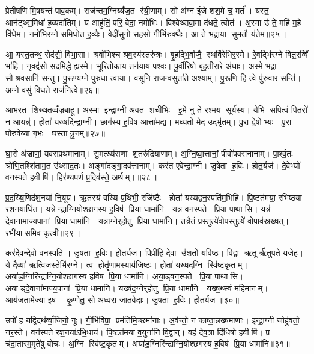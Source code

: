प्रेती॑षणि मि॒षय॑न्तं पाव॒कम्। राज॑न्तम॒ग्निय्यँ॑ज॒त र॑यी॒णाम्। सो अ॑ग्न ईजे शश॒मे च॒ मर्त॑। यस्त॒ आन॑ट्थ्स॒मिधा॑ ह॒व्यदा॑तिम्। य आहु॑तिं॒ परि॒ वेदा॒ नमो॑भिः। विश्वेथ्सवा॒मा द॑धते॒ त्वोत॑। अ॒स्मा उ॑ ते॒ महि॑ म॒हे वि॑धेम। नमो॑भिरग्ने स॒मिधो॒त ह॒व्यैः। वेदी॑सूनो सहसो गी॒र्भिरु॒क्थैः। आ ते भ॒द्राया सुम॒तौ य॑तेम॥२५॥

आ॒ यस्त॒तन्थ॒ रोद॑सी॒ विभा॒सा। श्रवो॑भिश्च श्रव॒स्य॑स्तरु॑त्रः। बृ॒हद्भि॒र्वाजै॒ स्थवि॑रेभिर॒स्मे। रे॒वद्भि॑रग्ने वित॒रव्विँ भा॑हि। नृ॒वद्व॑सो॒ सद॒मिद्धेह्य॒स्मे। भूरि॑तो॒काय॒ तन॑याय प॒श्वः। पू॒र्वीरिषो॑ बृह॒तीरा॒रे अ॑घाः। अ॒स्मे भ॒द्रा सौश्रव॒सानि॑ सन्तु। पु॒रूण्य॑ग्ने पुरु॒धा त्वा॒या। वसू॑नि राजन्व॒सुता॑ते अश्याम्। पु॒रूणि॒ हि त्वे पु॑रुवार॒ सन्ति॑। अग्ने॒ वसु॑ विध॒ते राज॑नि॒त्वे॥२६॥\anuvakamend[जा॒गृ॒वासो॒ अनु॑ग्म॒न्मानु॑षाणाञ्चर्‌षणी॒नाय्यँ॑तेमाश्या॒न्द्वे च॑]

आभ॑रत शिख्षतव्वँज्रबाहू। अ॒स्मा इ॑न्द्राग्नी अवत॒ शची॑भिः। इ॒मे नु ते र॒श्मय॒ सूर्य॑स्य। येभि॑ सपि॒त्वं पि॒तरो॑ न॒ आयन्न्॑। होता॑ यख्षदिन्द्रा॒ग्नी। छाग॑स्य ह॒विष॒ आत्ता॑म॒द्य। म॒ध्य॒तो मेद॒ उद्भृ॑तम्। पु॒रा द्वेषोभ्यः। पु॒रा पौरु॑षेय्या गृ॒भः। घस्तान्नू॒नम्॥२७॥

घा॒से अ॑ज्राणां॒ यव॑सप्रथमानाम्। सु॒मत्ख्ष॑राणा श॒तरु॑द्रियाणाम्। अ॒ग्नि॒ष्वा॒त्तानां॒ पीवो॑पवसनानाम्। पा॒र्श्व॒तः श्रो॑णि॒तश्शि॑ताम॒त उ॑थ्साद॒तः। अङ्गा॑दङ्गा॒दव॑त्तानाम्। कर॑त ए॒वेन्द्रा॒ग्नी। जु॒षेता ह॒विः। होत॒र्यज॑। दे॒वेभ्यो॑ वनस्पते ह॒वीषि॑। हिर॑ण्यपर्ण प्र॒दिव॑स्ते॒ अर्थम्।॥२८॥

प्र॒द॒ख्षि॒णिद्र॑श॒नया॑ नि॒यूय॑। ऋ॒तस्य॑ वख्षि प॒थिभी॒ रजि॑ष्ठैः। होता॑ यख्षद्वन॒स्पति॑म॒भिहि। पि॒ष्टत॑मया॒ रभि॑ष्ठया रश॒नयाधि॑त। यत्रेन्द्राग्नि॒योश्छाग॑स्य ह॒विष॑ प्रि॒या धामा॑नि। यत्र॒ वन॒स्पते प्रि॒या पाथासि। यत्र॑ दे॒वाना॑माज्य॒पानां प्रि॒या धामा॑नि। यत्रा॒ग्नेर्‌होतु॑ प्रि॒या धामा॑नि। तत्रै॒तं प्र॒स्तुत्ये॑वोप॒स्तुत्ये॑ वो॒पाव॑स्रख्षत्। रभी॑यासमिव कृ॒त्वी॥२९॥

कर॑दे॒वन्दे॒वो वन॒स्पति॑। जु॒षता ह॒विः। होत॒र्यज॑। पि॒प्री॒हि दे॒वा उ॑श॒तो य॑विष्ठ। वि॒द्वा ऋ॒तूर्\mbox{}ऋ॑तुपते यजे॒ह। ये दैव्या॑ ऋ॒त्विज॒स्तेभि॑रग्ने। त्व होतॄ॑णाम॒स्याय॑जिष्ठः। होता॑ यख्षद॒ग्नि स्वि॑ष्ट॒कृतम्। अया॑ड॒ग्निरि॑न्द्राग्नि॒योश्छाग॑स्य ह॒विष॑ प्रि॒या धामा॑नि। अया॒ड्वन॒स्पते प्रि॒या पाथासि। अयाड्दे॒वाना॑माज्य॒पानां प्रि॒या धामा॑नि। यख्ष॑द॒ग्नेर्‌होतु॑ प्रि॒या धामा॑नि। यख्ष॒थ्स्वं म॑हि॒मानम्। आय॑जता॒मेज्या॒ इष॑। कृ॒णोतु॒ सो अ॑ध्व॒रा जा॒तवे॑दाः। जु॒षता ह॒विः। होत॒र्यज॑ ॥३०॥\anuvakamend[नू॒नमर्थ॑ङ्कृ॒त्वी पाथासि स॒प्त च॑]

उपो॑ ह॒ यद्वि॒दथ॑व्वाँ॒जिनो॒ गूः। गी॒र्भिर्विप्रा॒ प्रम॑तिमि॒च्छमा॑नाः। अ॒र्वन्तो॒ न काष्ठा॒न्नख्ष॑माणाः। इ॒न्द्रा॒ग्नी जोहु॑वतो॒ नर॒स्ते। वन॑स्पते रश॒नया॑ऽभि॒धाय॑। पि॒ष्टत॑मया व॒युना॑नि वि॒द्वान्। वह॑ देव॒त्रा दि॑धिषो ह॒वीषि॑। प्र च॑दा॒तार॑म॒मृते॑षु वोचः। अ॒ग्नि स्वि॑ष्ट॒कृतम्। अया॑ड॒ग्निरि॑न्द्राग्नि॒योश्छग॑स्य ह॒विष॑ प्रि॒या धामा॑नि॥३१॥

